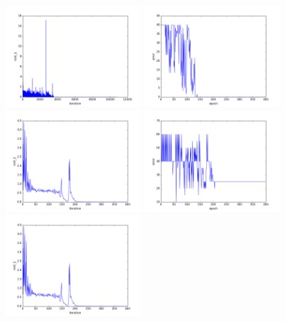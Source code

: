 \begin{figure}[htb]
\centering
\includegraphics[width=0.45\textwidth]{images/redes/ejecucion1/general_svm_frav_rgb_nir/cost.png}
\includegraphics[width=0.45\textwidth]{images/redes/ejecucion1/general_svm_frav_rgb_nir/error.png}
\includegraphics[width=0.45\textwidth]{images/redes/ejecucion1/general_svm_frav_rgb_nir/minidataset/cost.png}
\includegraphics[width=0.45\textwidth]{images/redes/ejecucion1/general_svm_frav_rgb_nir/minidataset/error.png}
\includegraphics[width=0.45\textwidth]{images/redes/ejecucion1/general_svm_frav_rgb_nir/minidataset_tested_itself/cost.png}

\end{figure}
